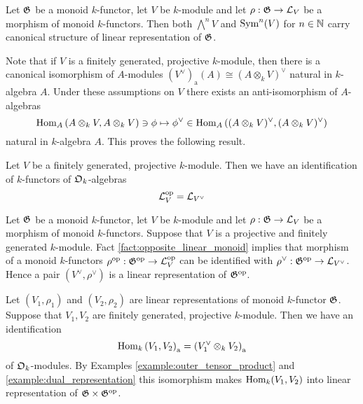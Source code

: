 \begin{example}\label{example:tensor_operations}
Let ${\mathfrak G}$ be a monoid $k$-functor, let $V$ be $k$-module and let $\rho:{\mathfrak G}\rightarrow {\mathcal L}_V$ be a morphism of monoid $k$-functors. Then both $\bigwedge^nV$ and $\textrm{Sym}^n(V)$ for $n\in {\mathbb N}$ carry canonical structure of linear representation of ${\mathfrak G}$.
\end{example}
\noindent
Note that if $V$ is a finitely generated, projective $k$-module, then there is a canonical isomorphism of $A$-modules $\left(V^{\vee}\right)_{\mathrm{a}}(A) \cong (A\otimes_kV)^{\vee}$ natural in $k$-algebra $A$. Under these assumptions on $V$ there exists an anti-isomorphism of $A$-algebras
$$\mathrm{Hom}_A\left(A\otimes_kV,A\otimes_kV\right)\ni \phi \mapsto \phi^{\vee} \in \mathrm{Hom}_A\left((A\otimes_kV)^{\vee},(A\otimes_kV)^{\vee}\right)$$
natural in $k$-algebra $A$. This proves the following result.

\begin{fact}\label{fact:opposite_linear_monoid}
Let $V$ be a finitely generated, projective $k$-module. Then we have an identification of $k$-functors of ${\mathfrak O}_k$-algebras
$${\mathcal L}_V^{\mathrm{op}} = {\mathcal L}_{V^{\vee}}$$
\end{fact}

\begin{example}\label{example:dual_representation}
Let ${\mathfrak G}$ be a monoid $k$-functor, let $V$ be $k$-module and let $\rho:{\mathfrak G}\rightarrow {\mathcal L}_V$ be a morphism of monoid $k$-functors. Suppose that $V$ is a projective and finitely generated $k$-module. Fact \ref{fact:opposite_linear_monoid} implies that morphism of a monoid $k$-functors $\rho^{\mathrm{op}}:{\mathfrak G}^{\mathrm{op}}\rightarrow {\mathcal L}_V^{\mathrm{op}}$ can be identified with $\rho^{\vee}:{\mathfrak G}^{\mathrm{op}}\rightarrow {\mathcal L}_{V^{\vee}}$. Hence a pair $(V^{\vee},\rho^{\vee})$ is a linear representation of ${\mathfrak G}^{\mathrm{op}}$.
\end{example}
\noindent

\begin{example}\label{example:hom_representation}
Let $(V_1,\rho_1)$ and $(V_2,\rho_2)$ are linear representations of monoid $k$-functor ${\mathfrak G}$. Suppose that $V_1,V_2$ are finitely generated, projective $k$-module. Then we have an identification
$$\mathrm{Hom}_k\left(V_1,V_2\right)_{\mathrm{a}} = \left(V_1^{\vee}\otimes_kV_2\right)_{\mathrm{a}}$$
of ${\mathfrak O}_k$-modules. By Examples \ref{example:outer_tensor_product} and \ref{example:dual_representation} this isomorphism makes $\mathrm{Hom}_k(V_1,V_2)$ into linear representation of ${\mathfrak G}\times {\mathfrak G}^{\mathrm{op}}$.
\end{example}

